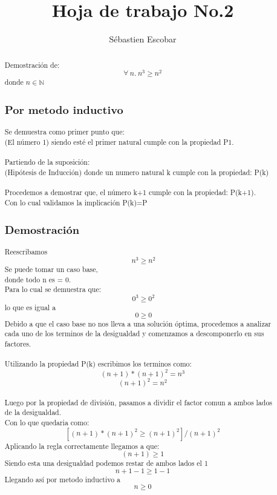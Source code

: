 \documentclass[12pt,letterpaper,twocolumn]{article}
\begin{document}
\title{Hoja de trabajo No.2}
\author{Sébastien Escobar}
\maketitle
\renewcommand{\abstractname}{Ejercicio No.1 }
\begin{abstract}
Demostración de: 
\[
        \forall\ n.\ n^3\geq n^2
\] donde $n\in\mathbb{N}$

\subsection*{Por metodo inductivo}
Se demuestra como primer punto que:
\\ (El número 1) siendo esté el primer natural cumple con la propiedad P1.
\\
\\Partiendo de la suposición:
\\ (Hipótesis de Inducción) donde un numero natural k cumple con la propiedad: P(k)
\\
\\Procedemos a demostrar que, el número k+1 cumple con la propiedad: P(k+1). 
\\Con lo cual validamos la implicación P(k)=P
\subsection*{Demostración}
Reescribamos \[
       \ n^3\geq n^2
\] Se puede tomar un caso base, 
\\donde todo n es = 0.
\\Para lo cual se demuestra que:
\[
        \ 0^3\geq 0^2
\] lo que es igual a
\[
        \ 0\geq 0
\]
Debido a que el caso base no nos lleva a una solución óptima, procedemos a analizar cada uno de los terminos
de la desigualdad y comenzamos a descomponerlo en sus factores.
\\
\\Utilizando la propiedad P(k) escribimos los terminos como:
\[(n+1)*(n+1)^2 = n^3\]
\[(n+1)^2 = n^2\]
\\Luego por la propiedad de división, pasamos a dividir el factor comun a ambos lados de la desigualdad.
\\Con lo que quedaria como:
\[[(n+1)*(n+1)^2 \geq (n+1)^2]/(n+1)^2\]
Aplicando la regla correctamente llegamos a que:
\[(n+1) \geq 1\]
Siendo esta una desigualdad podemos restar de ambos lados el 1
\[n+1-1 \geq 1-1\]
Llegando así por metodo inductivo a
\[n \geq 0\]
\end{abstract}
\end{document}
